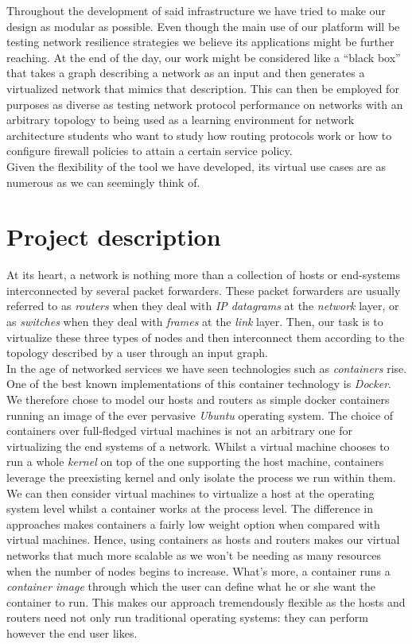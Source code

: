 \documentclass[12pt]{article}
\begin{document}
        Throughout the development of said infrastructure we have tried to make our design as modular as possible. Even though the main use of our platform will be testing network resilience strategies we believe its applications might be further reaching. At the end of the day, our work might be considered like a ``black box'' that takes a graph describing a network as an input and then generates a virtualized network that mimics that description. This can then be employed for purposes as diverse as testing network protocol performance on networks with an arbitrary topology to being used as a learning environment for network architecture students who want to study how routing protocols work or how to configure firewall policies to attain a certain service policy.\\

        Given the flexibility of the tool we have developed, its virtual use cases are as numerous as we can seemingly think of.\\

    \section{Project description}
        At its heart, a network is nothing more than a collection of hosts or end-systems interconnected by several packet forwarders. These packet forwarders are usually referred to as \textit{routers} when they deal with \textit{IP datagrams} at the \textit{network} layer, or as \textit{switches} when they deal with \textit{frames} at the \textit{link} layer. Then, our task is to virtualize these three types of nodes and then interconnect them according to the topology described by a user through an input graph.\\

        In the age of networked services we have seen technologies such as \textit{containers} rise. One of the best known implementations of this container technology is \textit{Docker}. We therefore chose to model our hosts and routers as simple docker containers running an image of the ever pervasive \textit{Ubuntu} operating system. The choice of containers over full-fledged virtual machines is not an arbitrary one for virtualizing the end systems of a network. Whilst a virtual machine chooses to run a whole \textit{kernel} on top of the one supporting the host machine, containers leverage the preexisting kernel and only isolate the process we run within them. We can then consider virtual machines to virtualize a host at the operating system level whilst a container works at the process level. The difference in approaches makes containers a fairly low weight option when compared with virtual machines. Hence, using containers as hosts and routers makes our virtual networks that much more scalable as we won't be needing as many resources when the number of nodes begins to increase. What's more, a container runs a \textit{container image} through which the user can define what he or she want the container to run. This makes our approach tremendously flexible as the hosts and routers need not only run traditional operating systems: they can perform however the end user likes.\\
\end{document}
